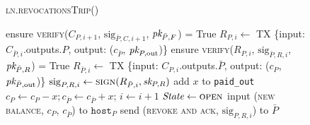 \begin{figure}[H]
  \begin{processbox}{\textsc{ln}.\textsc{revocationsTrip}()}
    \begin{algorithmic}[1]
      \State ensure \textsc{verify}($C_{P, i+1}$, $\mathrm{sig}_{\bar{P}, C,
      i+1}$, $\textit{pk}_{\bar{P}, F}$) = True
      \State $R_{P, i} \gets$ TX \{input: $C_{\bar{P}, i}$.outputs.$P$,
      output: ($c_{\bar{P}}$, $\textit{pk}_{P, \mathrm{out}}$)\}
      \State ensure \textsc{verify}($R_{P, i}$, $\mathrm{sig}_{\bar{P}, R,
      i}$, $\textit{pk}_{\bar{P}, R}$) = True
      \State $R_{\bar{P}, i} \gets$ TX \{input: $C_{P, i}$.outputs.$\bar{P}$,
      output: ($c_P$, $\textit{pk}_{\bar{P}, \mathrm{out}}$)\}
      \State $\mathrm{sig}_{P, R, i} \gets \textsc{sign}(R_{\bar{P}, i},
      \textit{sk}_{P, R})$
      \State add $x$ to \texttt{paid\_out}
      \label{code:ln:pay:revocations:paid-out}
      \State $c_P \gets c_P - x; c_{\bar{P}} \gets c_{\bar{P}} + x$; $i \gets
      i + 1$
      \State $\itistate \gets \textsc{open}$
       
        \State input (\textsc{new balance}, $c_P$, $c_{\bar{P}}$) to
        $\texttt{host}_P$
        \State {}
        \State {}
        \State {}
        \State {}
        \State {}
      \EndIf
      \State send (\textsc{revoke and ack}, $\mathrm{sig}_{P, R, i}$) to
      $\bar{P}$
      \State {}
      \State {}
      \State {}
      \State {}
      \label{code:ln:pay:revocations:paid-in}
      \State {}
      \State {}
\end{algorithmic}
\end{processbox}
\end{figure}
